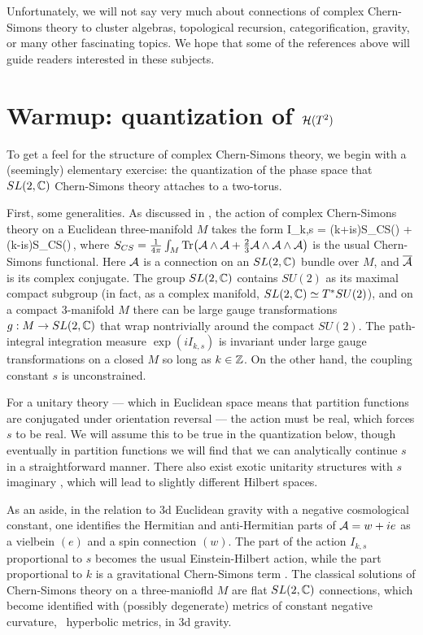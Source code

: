 \documentclass[12pt]{article}
\begin{document}
Unfortunately, we will not say very much about connections of complex Chern-Simons theory to cluster algebras, topological recursion, categorification, gravity, or many other fascinating topics. We hope that some of the references above will guide readers interested in these subjects.


\section{Warmup: quantization of $\mathcal{H}(T^2)$}
\label{DI.sec:quant}

To get a feel for the structure of complex Chern-Simons theory, we begin with a (seemingly) elementary exercise: the quantization of the phase space that $SL(2,{\mathbb C})$ Chern-Simons theory attaches to a two-torus.

First, some generalities. As discussed in \cite{DIWitten-cx}, the action of complex Chern-Simons theory on a Euclidean three-manifold $M$ takes the form
%
\DIbe I_{k,s} = (k+is)S_{CS}(\CalA) + (k-is)S_{CS}(\ol\CalA)\,, \label{DI.action} \DIee
%
where $S_{CS} = \frac{1}{4\pi}\int_M \text{Tr}\big(\mathcal{A}\wedge\mathcal{A}+\frac23\mathcal{A}\wedge\mathcal{A}\wedge\mathcal{A}\big)$ is the usual Chern-Simons functional. Here $\mathcal{A}$ is a connection on an $SL(2,{\mathbb C})$ bundle over $M$, and $\overline {\mathcal{A}}$ is its complex conjugate. The group $SL(2,{\mathbb C})$ contains $SU(2)$ as its maximal compact subgroup (in fact, as a complex manifold, $SL(2,{\mathbb C})\simeq T^*SU(2)$), and on a compact 3-manifold $M$ there can be large gauge transformations $g:M\to SL(2,{\mathbb C})$ that wrap nontrivially around the compact $SU(2)$. The path-integral integration measure $\exp(i I_{k,s})$ is invariant under large gauge transformations on a closed $M$ so long as $k\in {\mathbb Z}$. On the other hand, the coupling constant $s$ is unconstrained.

For a unitary theory --- which in Euclidean space means that partition functions are conjugated under orientation reversal --- the action must be real, which forces $s$ to be real. We will assume this to be true in the quantization below, though eventually in partition functions we will find that we can analytically continue $s$ in a straightforward manner. There also exist exotic unitarity structures with $s$ imaginary \cite{DIWitten-cx}, which will lead to slightly different Hilbert spaces.


As an aside, in the relation to 3d Euclidean gravity with a negative cosmological constant, one identifies the Hermitian and anti-Hermitian parts of $\mathcal{A} = w+ie$ as a vielbein $(e)$ and a spin connection $(w)$. The part of the action $I_{k,s}$ proportional to $s$ becomes the usual Einstein-Hilbert action, while the part proportional to $k$ is a gravitational Chern-Simons term \cite{DIWitten-gravCS}. The classical solutions of Chern-Simons theory on a three-maniofld $M$ are flat $SL(2,{\mathbb C})$ connections, which become identified with (possibly degenerate) metrics of constant negative curvature, \DIie\ hyperbolic metrics, in 3d gravity.
\end{document}
